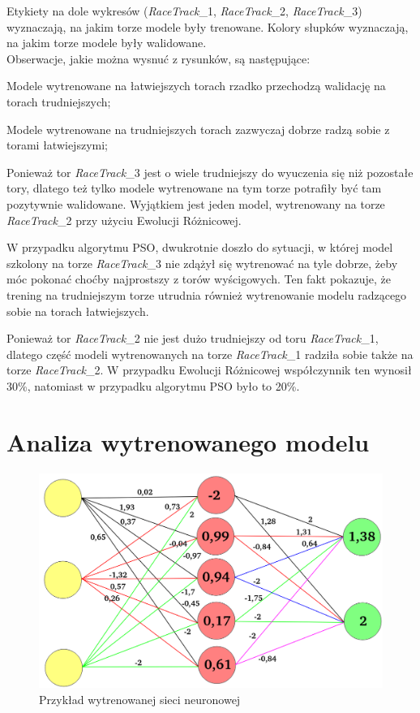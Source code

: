 Etykiety na dole wykresów (\textit{RaceTrack}\_1, \textit{RaceTrack}\_2, \textit{RaceTrack}\_3) wyznaczają, na jakim torze modele były trenowane. Kolory słupków wyznaczają, na jakim torze modele były walidowane. \\
Obserwacje, jakie można wysnuć z rysunków, są następujące:
\begin{enumerate*}
\item Modele wytrenowane na łatwiejszych torach rzadko przechodzą walidację na torach trudniejszych;
\item Modele wytrenowane na trudniejszych torach zazwyczaj dobrze radzą sobie z torami łatwiejszymi;
\item Ponieważ tor \textit{RaceTrack}\_3 jest o wiele trudniejszy do wyuczenia się niż pozostałe tory, dlatego też tylko modele wytrenowane na tym torze potrafiły być tam pozytywnie walidowane. Wyjątkiem jest jeden model, wytrenowany na torze \textit{RaceTrack}\_2 przy użyciu Ewolucji Różnicowej.
\item W przypadku algorytmu PSO, dwukrotnie doszło do sytuacji, w której model szkolony na torze \textit{RaceTrack}\_3 nie zdążył się wytrenować na tyle dobrze, żeby móc pokonać choćby najprostszy z torów wyścigowych. Ten fakt pokazuje, że trening na trudniejszym torze utrudnia również wytrenowanie modelu radzącego sobie na torach łatwiejszych.
\item Ponieważ tor \textit{RaceTrack}\_2 nie jest dużo trudniejszy od toru \textit{RaceTrack}\_1, dlatego część modeli wytrenowanych na torze \textit{RaceTrack}\_1 radziła sobie także na torze \textit{RaceTrack}\_2. W przypadku Ewolucji Różnicowej współczynnik ten wynosił 30\%, natomiast w przypadku algorytmu PSO było to 20\%.
\end{enumerate*}

\section{Analiza wytrenowanego modelu}
\begin{figure}[H]
\centering
\includegraphics[width=15cm]{resources/figures/trained_model_example.png}
\caption{Przykład wytrenowanej sieci neuronowej}
\label{TrainedNetworkExample}
\end{figure}

